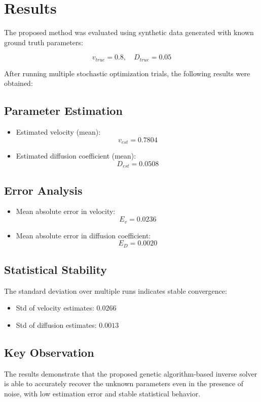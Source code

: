 \section{Results}

The proposed method was evaluated using synthetic data generated with known ground truth parameters:

\[
v_{true} = 0.8, \quad D_{true} = 0.05
\]

After running multiple stochastic optimization trials, the following results were obtained:

\subsection{Parameter Estimation}

\begin{itemize}
    \item Estimated velocity (mean):
    \[
    v_{est} = 0.7804
    \]

    \item Estimated diffusion coefficient (mean):
    \[
    D_{est} = 0.0508
    \]
\end{itemize}

\subsection{Error Analysis}

\begin{itemize}
    \item Mean absolute error in velocity:
    \[
    E_v = 0.0236
    \]

    \item Mean absolute error in diffusion coefficient:
    \[
    E_D = 0.0020
    \]
\end{itemize}

\subsection{Statistical Stability}

The standard deviation over multiple runs indicates stable convergence:

\begin{itemize}
    \item Std of velocity estimates: $0.0266$
    \item Std of diffusion estimates: $0.0013$
\end{itemize}

\subsection{Key Observation}

The results demonstrate that the proposed genetic algorithm-based inverse solver is able to accurately recover the unknown parameters even in the presence of noise, with low estimation error and stable statistical behavior.